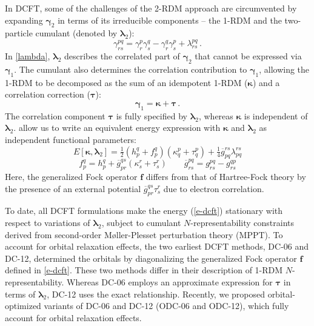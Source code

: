 In DCFT, some of the challenges of the 2-RDM approach are circumvented by
expanding $\boldsymbol{\gamma}_2$ in terms of its irreducible components -- the 1-RDM and
the two-particle cumulant (denoted by $\boldsymbol{\lambda}_2$):
\begin{equation}
	\label{lambda}
	\gamma_{rs}^{pq}
    =
	\gamma_r^p
    \gamma_s^q
    -
    \gamma_r^q
    \gamma_s^p
	+
    \lambda_{rs}^{pq}\,.
\end{equation}
In \cref{lambda}, $\boldsymbol{\lambda}_2$ describes the correlated part of $\boldsymbol{\gamma}_2$ that
cannot be expressed via $\boldsymbol{\gamma}_1$. The cumulant also determines the correlation
contribution to $\boldsymbol{\gamma}_1$, allowing the 1-RDM to be decomposed as the sum of an
idempotent 1-RDM ($\boldsymbol{\kappa}$) and a correlation correction ($\boldsymbol{\tau}$):
\begin{equation}
	\label{tau}
	\boldsymbol{\gamma}_1
    =
    \boldsymbol{\kappa}
    +
    \boldsymbol{\tau}\,.
\end{equation}
The correlation component $\boldsymbol{\tau}$ is fully specified by $\boldsymbol{\lambda}_2$, whereas
$\boldsymbol{\kappa}$ is independent of $\boldsymbol{\lambda}_2$.  allow us to write an
equivalent energy expression with $\boldsymbol{\kappa}$ and $\boldsymbol{\lambda}_2$ as independent
functional parameters:
\begin{equation}
	\label{e-dcft}
    E[\boldsymbol{\kappa},\boldsymbol{\lambda}_2]
    =
    \tfrac{1}{2}
    (h_p^q+f_p^q)
    (\kappa_q^p+\tau_q^p)
    +
    \tfrac{1}{4}
    \overline{g}_{pq}^{rs}
    \lambda_{pq}^{rs}
\end{equation}
\begin{equation}
    f_p^q
    =
    h_p^q
    +
    \overline{g}_{pr}^{qs}
    (\kappa_s^r+\tau_s^r)
    \qquad
    \overline{g}_{rs}^{pq}
    =
    g_{rs}^{pq}
    -
    g_{rs}^{qp}
\end{equation}
Here, the generalized Fock operator $\boldsymbol{f}$ differs from that of
Hartree-Fock theory by the presence of an external potential
$\overline{g}_{pr}^{qs}\tau_s^r$ due to electron
correlation.\cite{Kutzelnigg:2006p171101}


To date, all DCFT formulations make the energy (\ref{e-dcft}) stationary with
respect to variations of $\boldsymbol{\lambda}_2$, subject to cumulant
$N$-representability constraints derived from second-order M\o ller-Plesset
perturbation theory (MPPT).\cite{Kutzelnigg:2004p7350}
To account for orbital relaxation effects, the two earliest DCFT methods,
DC-06\cite{Kutzelnigg:2006p171101,Simmonett:2010p174122,Sokolov:2012p054105} and
DC-12\cite{Sokolov:2013p024107}, determined the orbitals by diagonalizing the
generalized Fock operator $\boldsymbol{f}$ defined in \cref{e-dcft}.
These two methods differ in their description of 1-RDM $N$-representability.
Whereas DC-06 employs an approximate expression for $\boldsymbol{\tau}$ in terms
of $\boldsymbol{\lambda}_2$, DC-12 uses the exact relationship.
Recently, we proposed orbital-optimized variants of DC-06 and DC-12 (ODC-06 and
ODC-12),\cite{Sokolov:2013p204110} which fully account for orbital relaxation
effects.


